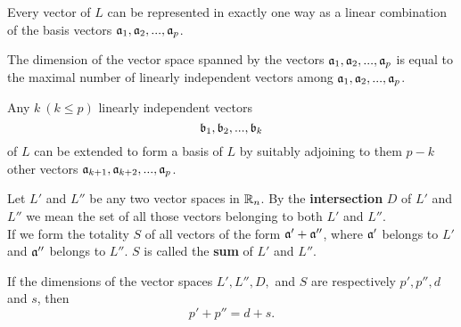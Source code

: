 \begin{theorem}
Every vector of $L$ can be represented in exactly one way as a linear combination of the basis vectors $\mathfrak{a}_1, \mathfrak{a}_2, ..., \mathfrak{a}_p$.\label{Th2_4}
\end{theorem}

\begin{theorem}
The dimension of the vector space spanned by the vectors $\mathfrak{a}_1, \mathfrak{a}_2, ...,\mathfrak{a}_p$ is equal to the maximal number of linearly independent vectors among $\mathfrak{a}_1, \mathfrak{a}_2, ..., \mathfrak{a}_p$.\label{Th2_5}
\end{theorem}

\begin{theorem}
Any $k ~ (k\le p)$ linearly independent vectors $$\mathfrak{b}_1, \mathfrak{b}_2, ..., \mathfrak{b}_k$$
 of $L$ can be extended to form a basis of $L$ by suitably adjoining to them $p-k$ other vectors $\mathfrak{a}_{k+1}, \mathfrak{a}_{k+2}, ..., \mathfrak{a}_p$.\label{Th2_6}
\end{theorem}

Let $L'$ and $L''$ be any two vector spaces in $\mathbb{R}_n$. By the {\bf intersection} $D$ of $L'$ and $L''$ we mean the set of all those vectors belonging to both $L'$ and $L''$.\\

If we form the totality $S$ of all vectors of the form $\mathfrak{a}' + \mathfrak{a}''$, where $\mathfrak{a}'$ belongs to $L'$ and $\mathfrak{a}''$ belongs to $L''$. $S$ is called the {\bf sum} of $L'$ and $L''$.

\begin{theorem}
If the dimensions of the vector spaces $L', L'', D,$ and $S$ are respectively $p', p'', d$ and $s$, then $$p' + p'' = d + s.$$\label{Th2_7}
\end{theorem}